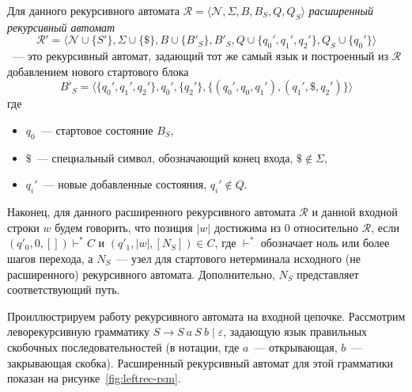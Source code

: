\begin{definition}
    Для данного рекурсивного автомата $\mathcal{R}=\langle \mathcal{N},\Sigma,B,B_S,Q,Q_S\rangle$
    \textit{расширенный рекурсивный автомат}
    \[ \mathcal{R}'=\langle \mathcal{N} \cup \{S'\},\Sigma \cup\{\$\}, B \cup \{B'_S\}, B'_S, Q \cup \{q_0',q_1',q_2'\},Q_S \cup \{q_0'\}\rangle \]
    ~--- это рекурсивный автомат, задающий тот же самый язык и построенный из $\mathcal{R}$ добавлением нового стартового блока
    \[ B'_S = \langle \{q_0',q_1',q_2'\}, q_0', \{q_2'\}, \{(q_0',q_0,q_1'),(q_1',\$, q_2')\} \rangle \] где
    \begin{itemize}
        \item $q_0$~--- стартовое состояние $B_S$,
        \item $\$$~--- специальный символ, обозначающий конец входа, $\$ \notin \Sigma$,
        \item $q_i'$~--- новые добавленные состояния, $q_i'\notin Q$.
    \end{itemize}
\end{definition}

Наконец, для данного расширенного рекурсивного автомата $\mathcal{R}$ и данной входной строки $w$ будем говорить, что позиция $|w|$ достижима из $0$ относительно $\mathcal{R}$, если $(q'_0,0,[]) \vdash^* C$ и $(q'_1,|w|,[N_S]) \in C$, где $\vdash^*$ обозначает ноль или более шагов перехода, а $N_S$~--- узел для стартового нетерминала исходного (не расширенного) рекурсивного автомата. Дополнительно, $N_S$ представляет соответствующий путь.

Проиллюстрируем работу рекурсивного автомата на входной цепочке.
Рассмотрим леворекурсивную грамматику $S \to S \ a \ S \ b \mid \varepsilon$, задающую язык правильных скобочных последовательностей (в нотации, где $a$~--- открывающая, $b$~--- закрывающая скобка).
Расширенный рекурсивный автомат для этой грамматики показан на рисунке~\ref{fig:leftrec-rsm}.

\begin{marginfigure}
    \begin{center}
        \resizebox{\marginparwidth}{!}{
            
        }
    \end{center}
    \caption{Расширенный рекурсивный автомат для леворекурсивной грамматики $S \to S \ a \ S \ b \mid \varepsilon$}
    \label{fig:leftrec-rsm}
\end{marginfigure}

